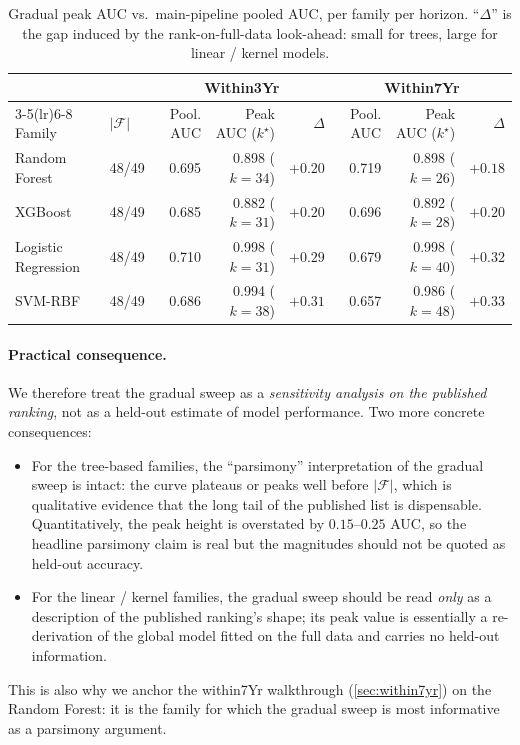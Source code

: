 \documentclass[11pt,a4paper]{article}
\providecommand{\Cref}[1]{\autoref{#1}}
\begin{document}
\begin{table}[h]
\centering
\caption{Gradual peak AUC vs.\ main-pipeline pooled AUC, per family per
horizon. ``$\Delta$'' is the gap induced by the rank-on-full-data
look-ahead: small for trees, large for linear / kernel models.}
\label{tab:cross_model_gradual}
\small
\begin{tabular}{ll rrr rrr}
\toprule
& & \multicolumn{3}{c}{Within3Yr} & \multicolumn{3}{c}{Within7Yr} \\
\cmidrule(lr){3-5}\cmidrule(lr){6-8}
Family & $|\mathcal{F}|$
       & Pool. AUC & Peak AUC ($k^\star$) & $\Delta$
       & Pool. AUC & Peak AUC ($k^\star$) & $\Delta$ \\
\midrule
Random Forest       & 48/49 & 0.695 & 0.898 ($k\!=\!34$) & $+0.20$ & 0.719 & 0.898 ($k\!=\!26$) & $+0.18$ \\
XGBoost             & 48/49 & 0.685 & 0.882 ($k\!=\!31$) & $+0.20$ & 0.696 & 0.892 ($k\!=\!28$) & $+0.20$ \\
Logistic Regression & 48/49 & 0.710 & 0.998 ($k\!=\!31$) & $+0.29$ & 0.679 & 0.998 ($k\!=\!40$) & $+0.32$ \\
SVM-RBF             & 48/49 & 0.686 & 0.994 ($k\!=\!38$) & $+0.31$ & 0.657 & 0.986 ($k\!=\!48$) & $+0.33$ \\
\bottomrule
\end{tabular}
\end{table}

\paragraph{Practical consequence.}
We therefore treat the gradual sweep as a \emph{sensitivity analysis on
the published ranking}, not as a held-out estimate of model performance.
Two more concrete consequences:
\begin{itemize}[leftmargin=*]
  \item For the tree-based families, the ``parsimony'' interpretation of
    the gradual sweep is intact: the curve plateaus or peaks well before
    $|\mathcal{F}|$, which is qualitative evidence that the long tail of
    the published list is dispensable. Quantitatively, the peak height
    is overstated by $0.15$--$0.25$ AUC, so the headline parsimony claim
    is real but the magnitudes should not be quoted as held-out
    accuracy.
  \item For the linear / kernel families, the gradual sweep should be
    read \emph{only} as a description of the published ranking's shape;
    its peak value is essentially a re-derivation of the global model
    fitted on the full data and carries no held-out information.
\end{itemize}
This is also why we anchor the within7Yr walkthrough
(\Cref{sec:within7yr}) on the Random Forest: it is the family for which
the gradual sweep is most informative as a parsimony argument.
\end{document}
